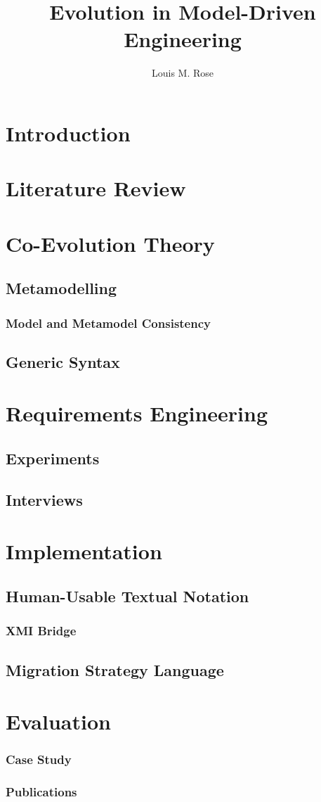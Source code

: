 \documentclass[a4paper]{book}
\title{Evolution in Model-Driven Engineering}
\author{Louis M. Rose}
\begin{document}
\maketitle

\tableofcontents

\chapter{Introduction}

\chapter{Literature Review}

\chapter{Co-Evolution Theory}
\section{Metamodelling}
\subsection{Model and Metamodel Consistency}
\section{Generic Syntax}

\chapter{Requirements Engineering}
\section{Experiments}
\section{Interviews}

\chapter{Implementation}
\section{Human-Usable Textual Notation}
\subsection{XMI Bridge}
\section{Migration Strategy Language}


\chapter{Evaluation}
\subsection{Case Study}
\subsection{Publications}
\end{document}
